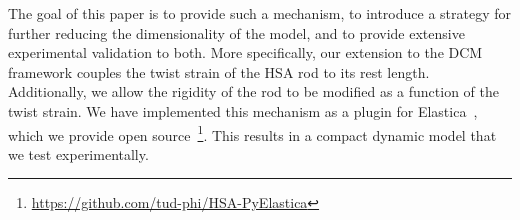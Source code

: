 The goal of this paper is to provide such a mechanism, to introduce a strategy for further reducing the dimensionality of the model, and to provide extensive experimental validation to both. More specifically, our extension to the \gls{DCM} framework couples the twist strain of the \gls{HSA} rod to its rest length. %
Additionally, we allow the rigidity of the rod to be modified as a function of the twist strain. %
We have implemented this mechanism as a plugin for Elastica~\cite{naughton2021elastica}, which we provide open source~\footnote{\scriptsize \url{https://github.com/tud-phi/HSA-PyElastica}}. 
This results in a compact dynamic model that we test experimentally.

